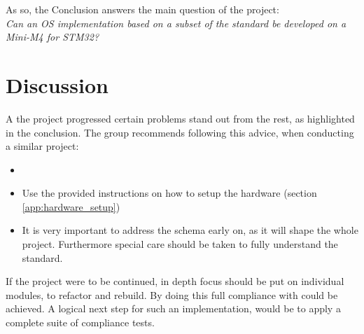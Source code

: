 As so, the Conclusion answers the main question of the project:\\
\textit{Can an OS implementation based on a subset of the \arinc{} standard be
developed on a Mini-M4 for STM32?}
\clearpage


\section{Discussion}
A the project progressed certain problems stand out from the rest,
as highlighted in the conclusion.
The group recommends following this advice,
when conducting a similar project:

\begin{itemize}
	\item
	\item Use the provided instructions on how to setup the hardware (section \ref{app:hardware_setup})
	\item It is very important to address the schema early on,
		as it will shape the whole project.
		Furthermore special care should be taken to fully understand the \arinc{} standard.
\end{itemize}

If the project were to be continued, in depth focus should be put on individual
modules, to refactor and rebuild.
By doing this full compliance with \arinc{} could be achieved.
A logical next step for such an implementation,
would be to apply a complete suite of compliance tests.


%
%


